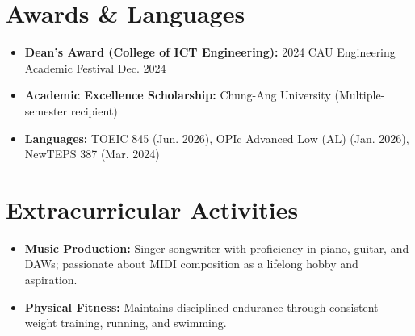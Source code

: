 \documentclass[11pt,a4paper,sans]{article}
\begin{document}
\section{Awards \& Languages}
\begin{itemize}[leftmargin=*, noitemsep]
    \item \textbf{Dean's Award (College of ICT Engineering):} 2024 CAU Engineering Academic Festival \hfill Dec. 2024
    \item \textbf{Academic Excellence Scholarship:} Chung-Ang University (Multiple-semester recipient)
    \item \textbf{Languages:} TOEIC 845 (Jun. 2026), OPIc Advanced Low (AL) (Jan. 2026), NewTEPS 387 (Mar. 2024)
\end{itemize}

\section{Extracurricular Activities}
\begin{itemize}[leftmargin=*]
    \item \textbf{Music Production:} Singer-songwriter with proficiency in piano, guitar, and DAWs; passionate about MIDI composition as a lifelong hobby and aspiration.
    \item \textbf{Physical Fitness:} Maintains disciplined endurance through consistent weight training, running, and swimming.
\end{itemize}
\end{document}
